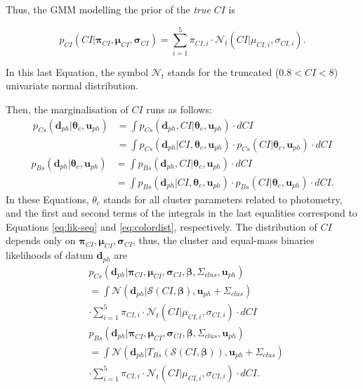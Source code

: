  Thus, the GMM modelling the prior of the \emph{true} $CI$ is 

\begin{equation}
\label{eq:colordist}
p_{CI}(CI|\boldsymbol{\pi}_{CI},\boldsymbol{\mu}_{CI},\boldsymbol{\sigma}_{CI})= \sum_{i=1}^5 \pi_{CI,i} \cdot \mathcal{N}_t(CI| \mu_{CI,i},\sigma_{CI,i}).
\end{equation}

In this last Equation, the symbol $\mathcal{N}_t$ stands for the truncated ($0.8<CI<8$) univariate normal distribution.

Then, the marginalisation of $CI$ runs as follows:
\begin{align}
\label{eq:clmarginalps}
 p_{Cs}(\mathbf{d}_{ph}| \boldsymbol{\theta}_c,\mathbf{u}_{ph})&=\int p_{Cs}(\mathbf{d}_{ph},CI| \boldsymbol{\theta}_c,\mathbf{u}_{ph}) \cdot dCI \nonumber \\
 &=\int p_{Cs}(\mathbf{d}_{ph}|CI, \boldsymbol{\theta}_c,\mathbf{u}_{ph}) \cdot p_{Cs}(CI| \boldsymbol{\theta}_c,\mathbf{u}_{ph})\cdot dCI 
\end{align}
\begin{align}
\label{eq:clmarginalpb}
p_{Bs}(\mathbf{d}_{ph}| \boldsymbol{\theta}_c,\mathbf{u}_{ph})&=\int p_{Bs}(\mathbf{d}_{ph},CI| \boldsymbol{\theta}_c,\mathbf{u}_{ph})\cdot dCI \nonumber \\
 &=\int p_{Bs}(\mathbf{d}_{ph}|CI, \boldsymbol{\theta}_c,\mathbf{u}_{ph})\cdot p_{Bs}(CI| \boldsymbol{\theta}_c,\mathbf{u}_{ph})\cdot dCI.
\end{align}
In these Equations, $\theta_c$ stands for all cluster parameters related to photometry, and the first and second terms of the integrals in the last equalities correspond to Equations \ref{eq:lik-seq} and \ref{eq:colordist}, respectively. The distribution of $CI$ depends only on $\boldsymbol{\pi}_{CI},\boldsymbol{\mu}_{CI},\boldsymbol{\sigma}_{CI}$, thus, the cluster and equal-mass binaries likelihoods of datum $\mathbf{d}_{ph}$ are 
\begin{align}
\label{eq:lik-seq2}
 &p_{Cs}(\mathbf{d}_{ph}|\boldsymbol{\pi}_{CI},\boldsymbol{\mu}_{CI},\boldsymbol{\sigma}_{CI},\boldsymbol{\beta},\Sigma_{clus},\mathbf{u}_{ph}) \nonumber \\
 &=\int{\mathcal{N}}(\mathbf{d}_{ph}|\boldsymbol{\mathcal{S}}(CI, \boldsymbol{\beta}), \mathbf{u}_{ph}+\Sigma_{clus}) \nonumber \\
 &\cdot \sum_{i=1}^5 \pi_{CI,i}\cdot \mathcal{N}_t(CI| \mu_{CI,i},\sigma_{CI,i}) \cdot dCI\nonumber \\
&p_{Bs}(\mathbf{d}_{ph}|\boldsymbol{\pi}_{CI},\boldsymbol{\mu}_{CI},\boldsymbol{\sigma}_{CI}, \boldsymbol{\beta},\Sigma_{clus}, \mathbf{u}_{ph})\nonumber \\
&=\int{\mathcal{N}}(\mathbf{d}_{ph}|T_{Bs}( \boldsymbol{\mathcal{S}}(CI, \boldsymbol{\beta})), \mathbf{u}_{ph}+\Sigma_{clus}) \nonumber \\ &\cdot \sum_{i=1}^5 \pi_{CI,i}\cdot \mathcal{N}_t(CI| \mu_{CI,i},\sigma_{CI,i}) \cdot dCI.
\end{align}

